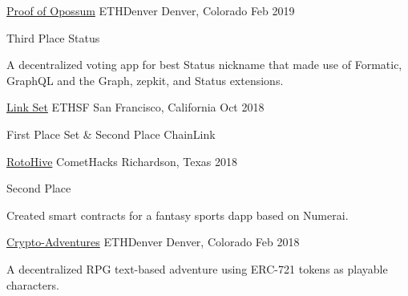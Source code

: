 
\begin{cventries}

	\cventry
	{\href{https://github.com/Emiller88/proof-of-opossum}{Proof of Opossum}} %
	{ETHDenver} %
	{Denver, Colorado} %
	{Feb 2019} %
	{
		\begin{cvitems} %
			\item {Third Place Status}
			\item {A decentralized voting app for best Status nickname that made
					use of Formatic, GraphQL and the Graph, zepkit, and Status extensions.}
		\end{cvitems}
	}

	\cventry
	{\href{https://github.com/Emiller88/Link-Set}{Link Set}} %
	{ETHSF} %
	{San Francisco, California} %
	{Oct 2018} %
	{
		\begin{cvitems} %
			\item {First Place Set \& Second Place ChainLink}
		\end{cvitems}
	}

	\cventry
	{\href{https://github.com/Emiller88/Rotohive}{RotoHive}} %
	{CometHacks} %
	{Richardson, Texas} %
	{2018} %
	{
		\begin{cvitems} %
			\item {Second Place}
			\item {Created smart contracts for a fantasy sports dapp based on Numerai.}
		\end{cvitems}
	}

	\cventry
	{\href{https://github.com/Crypto-Adventures}{Crypto-Adventures}} %
	{ETHDenver} %
	{Denver, Colorado} %
	{Feb 2018} %
	{
		\begin{cvitems} %
			\item {A decentralized RPG text-based adventure using ERC-721 tokens
					as playable characters.}
		\end{cvitems}
	}


\end{cventries}
